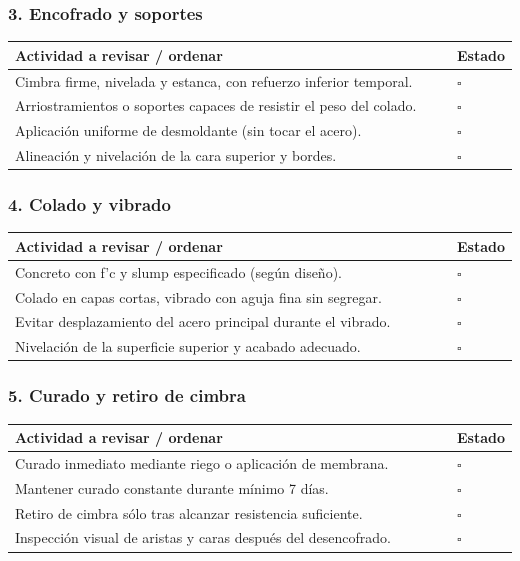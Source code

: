 \documentclass[12pt]{article}
\newcommand{\cbox}{\(\square\)} %
\begin{document}
	\subsubsection*{3. Encofrado y soportes}
	\begin{tabularx}{\linewidth}{>{\raggedright\arraybackslash}p{0.93\linewidth} >{\centering\arraybackslash}m{0.07\linewidth}}
		\toprule
		\textbf{Actividad a revisar / ordenar} & \textbf{Estado}\\
		\midrule
		Cimbra firme, nivelada y estanca, con refuerzo inferior temporal. & \cbox \\
		Arriostramientos o soportes capaces de resistir el peso del colado. & \cbox \\
		Aplicación uniforme de desmoldante (sin tocar el acero). & \cbox \\
		Alineación y nivelación de la cara superior y bordes. & \cbox \\
		\bottomrule
	\end{tabularx}
	
	\subsubsection*{4. Colado y vibrado}
	\begin{tabularx}{\linewidth}{>{\raggedright\arraybackslash}p{0.93\linewidth} >{\centering\arraybackslash}m{0.07\linewidth}}
		\toprule
		\textbf{Actividad a revisar / ordenar} & \textbf{Estado}\\
		\midrule
		Concreto con f’c y slump especificado (según diseño). & \cbox \\
		Colado en capas cortas, vibrado con aguja fina sin segregar. & \cbox \\
		Evitar desplazamiento del acero principal durante el vibrado. & \cbox \\
		Nivelación de la superficie superior y acabado adecuado. & \cbox \\
		\bottomrule
	\end{tabularx}
	
	\subsubsection*{5. Curado y retiro de cimbra}
	\begin{tabularx}{\linewidth}{>{\raggedright\arraybackslash}p{0.93\linewidth} >{\centering\arraybackslash}m{0.07\linewidth}}
		\toprule
		\textbf{Actividad a revisar / ordenar} & \textbf{Estado}\\
		\midrule
		Curado inmediato mediante riego o aplicación de membrana. & \cbox \\
		Mantener curado constante durante mínimo 7 días. & \cbox \\
		Retiro de cimbra sólo tras alcanzar resistencia suficiente. & \cbox \\
		Inspección visual de aristas y caras después del desencofrado. & \cbox \\
		\bottomrule
	\end{tabularx}
	
\end{document}
